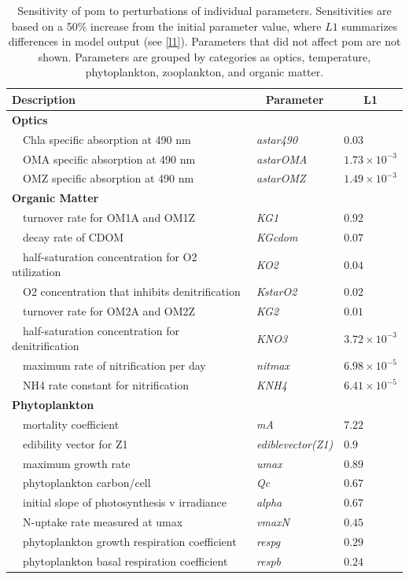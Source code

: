 \documentclass[review]{elsarticle}\usepackage[]{graphicx}\usepackage[]{color}
\begin{document}
\begin{table}[!tbp]
{\footnotesize
\caption{Sensitivity of \ac{pom} to perturbations of individual parameters.  Sensitivities are based on a 50\% increase from the initial parameter value, where $L1$ summarizes differences in model output (see \cref{l1}).  Parameters that did not affect \ac{pom} are not shown.  Parameters are grouped by categories as optics, temperature, phytoplankton, zooplankton, and organic matter.\label{tab:om1sens}} 
\begin{center}
\begin{tabular}{lll}
\hline\hline
\multicolumn{1}{l}{Description}&\multicolumn{1}{c}{Parameter}&\multicolumn{1}{c}{L1}\tabularnewline
\hline
{\bfseries Optics}&&\tabularnewline
~~Chla specific absorption at 490 nm&\textit{astar490}&$0.03$\tabularnewline
~~OMA specific absorption at 490 nm&\textit{astarOMA}&$1.73\times 10^{-3}$\tabularnewline
~~OMZ specific absorption at 490 nm&\textit{astarOMZ}&$1.49\times 10^{-3}$\tabularnewline
\hline
{\bfseries Organic Matter}&&\tabularnewline
~~turnover rate for OM1A and OM1Z&\textit{KG1}&$0.92$\tabularnewline
~~decay rate of CDOM&\textit{KGcdom}&$0.07$\tabularnewline
~~half-saturation concentration for O2 utilization&\textit{KO2}&$0.04$\tabularnewline
~~O2 concentration that inhibits denitrification&\textit{KstarO2}&$0.02$\tabularnewline
~~turnover rate for OM2A and OM2Z&\textit{KG2}&$0.01$\tabularnewline
~~half-saturation concentration for denitrification&\textit{KNO3}&$3.72\times 10^{-3}$\tabularnewline
~~maximum rate of nitrification per day&\textit{nitmax}&$6.98\times 10^{-5}$\tabularnewline
~~NH4 rate constant for nitrification&\textit{KNH4}&$6.41\times 10^{-5}$\tabularnewline
\hline
{\bfseries Phytoplankton}&&\tabularnewline
~~mortality coefficient&\textit{mA}&$7.22$\tabularnewline
~~edibility vector for Z1&\textit{ediblevector(Z1)}&$0.9$\tabularnewline
~~maximum growth rate&\textit{umax}&$0.89$\tabularnewline
~~phytoplankton carbon/cell&\textit{Qc}&$0.67$\tabularnewline
~~initial slope of photosynthesis v irradiance&\textit{alpha}&$0.67$\tabularnewline
~~N-uptake rate measured at umax&\textit{vmaxN}&$0.45$\tabularnewline
~~phytoplankton growth respiration coefficient&\textit{respg}&$0.29$\tabularnewline
~~phytoplankton basal respiration coefficient&\textit{respb}&$0.24$\tabularnewline

\end{tabular}
\end{center}}
\end{table}
\end{document}
